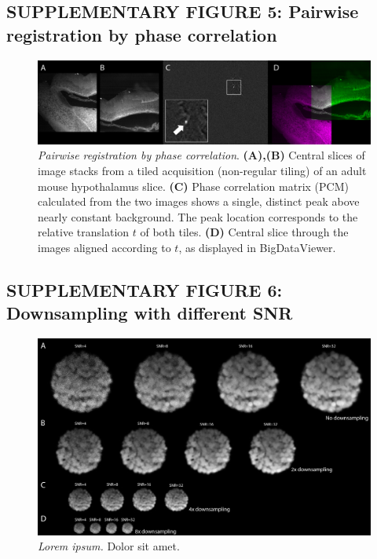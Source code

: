 \documentclass[]{spie}  %
\begin{document}
\subsection*{SUPPLEMENTARY FIGURE 5: Pairwise registration by phase correlation}
\vspace{1mm}
\begin{figure}[h!]
\includegraphics[width=\textwidth]{fig-stitching.png}
\vspace{-2.0mm}
\caption{\hspace{-0.5mm} \emph{Pairwise registration by phase correlation}. \textbf{(A),(B)} Central slices of image stacks from a tiled acquisition (non-regular tiling) of an adult mouse hypothalamus slice. \textbf{(C)} Phase correlation matrix (PCM) calculated from the two images shows a single, distinct peak above nearly constant background. The peak location corresponds to the relative translation $t$ of both tiles. \textbf{(D)} Central slice through the images aligned according to $t$, as displayed in BigDataViewer. 
}
\label{fig:sup-fig-stitching}
\end{figure}

\pagebreak



\subsection*{SUPPLEMENTARY FIGURE 6: Downsampling with different SNR}
\vspace{1mm}
\begin{figure}[h!]
\includegraphics[width=\textwidth]{fig-downsampling.png}
\vspace{-2.0mm}
\caption{\hspace{-0.5mm} \emph{Lorem ipsum.} Dolor sit amet.
}
\label{fig:sup-fig-downsampling}
\end{figure}
\end{document}
